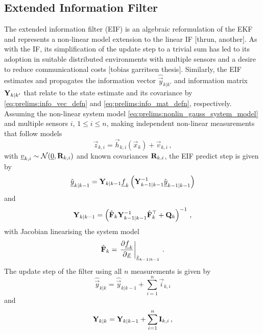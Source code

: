 \subsection{Extended Information Filter}\label{subsec:prelims:eif}
The extended information filter (EIF) is an algebraic reformulation of the EKF and represents a non-linear model extension to the linear IF [thrun, another]. As with the IF, its simplification of the update step to a trivial sum has led to its adoption in suitable distributed environments with multiple sensors and a desire to reduce communicational costs [tobias garritsen thesis]. Similarly, the EIF estimates and propagates the information vector $\hat{\vec{y}}_{k|k'}$ and information matrix ${{\mathbf{Y}}}_{k|k'}$ that relate to the state estimate and its covariance by \eqref{eq:prelims:info_vec_defn} and \eqref{eq:prelims:info_mat_defn}, respectively. Assuming the non-linear system model \eqref{eq:prelims:nonlin_gauss_system_model} and multiple sensors $i$, $1\leq i \leq n$, making independent non-linear measurements that follow models
\begin{equation}
    \vec{z}_{k,i} = \vec{h}_{k,i}\left(\vec{x}_k\right) + \vec{v}_{k,i}\,,
\end{equation}
with ${\underline{v}}_{k,i}\sim\mathcal{N}({\underline{0}},{{\mathbf{R}}}_{k,i})$ and known covariances ${{\mathbf{R}}}_{k,i}$, the EIF predict step is given by
\begin{equation}\label{eq:prelims:eif_info_vec_predict}
    \hat{{\underline{y}}}_{k|k-1} = {{\mathbf{Y}}}_{k|k-1}{\underline{f}}_k\left({{\mathbf{Y}}}_{k-1|k-1}^{-1}\hat{{\underline{y}}}_{k-1|k-1}\right)
\end{equation}
and
\begin{equation}\label{eq:prelims:eif_info_mat_predict}
    {\ensuremath{{\mathbf{Y}}}}_{k|k-1} = \left(\hat{{{\mathbf{F}}}}_k{{\mathbf{Y}}}_{k-1|k-1}^{-1}\hat{{{\mathbf{F}}}}_k^\top + {{\mathbf{Q}}}_k\right)^{-1}\,,
\end{equation}
with Jacobian linearising the system model
\begin{equation}
    \hat{{{\mathbf{F}}}}_k = \left.\frac{\partial {\underline{f}}_k}{\partial {\underline{x}}}\right|_{\hat{{\underline{x}}}_{k-1|k-1}}\,.
\end{equation}
The update step of the filter using all $n$ measurements is given by
\begin{equation}\label{eq:prelims:eif_info_vec_update}
    \hat{\vec{y}}_{k|k} = \hat{\vec{y}}_{k|k-1} + \sum_{i=1}^n\vec{i}_{k,i}
\end{equation}
and
\begin{equation}\label{eq:prelims:eif_info_mat_update}
    {\ensuremath{{\mathbf{Y}}}}_{k|k} = {{\mathbf{Y}}}_{k|k-1} + \sum_{i=1}^n{{\mathbf{I}}}_{k,i}\,,
\end{equation}
